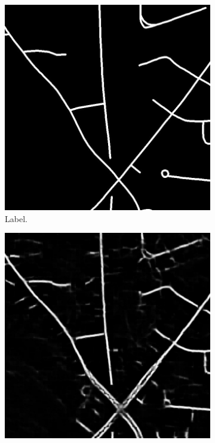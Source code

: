 \begin{figure}[H]
\begin{subfigure}{0.23\textwidth}
\includegraphics[width=\textwidth]{figs/appendix/label11128870_15.jpg}
\caption{ Label. }
\vspace{0.2cm} %
\end{subfigure}
\hspace*{\fill} %
\begin{subfigure}{0.23\textwidth}
\includegraphics[width=\textwidth]{figs/appendix/pred11128870_15.jpg}

\end{subfigure}
\end{figure}
